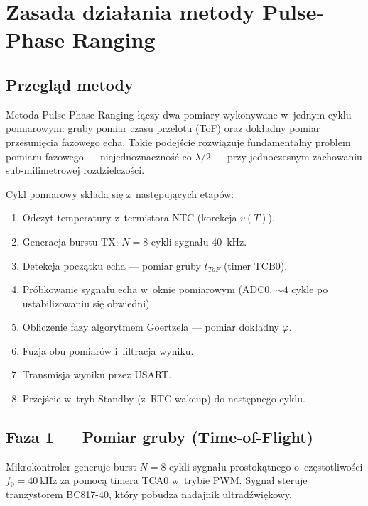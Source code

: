 \documentclass[a4paper,11pt]{article}
\begin{document}
\section{Zasada działania metody Pulse-Phase Ranging}
\label{sec:zasada}

\subsection{Przegląd metody}

Metoda Pulse-Phase Ranging łączy dwa pomiary wykonywane w~jednym cyklu
pomiarowym: gruby pomiar czasu przelotu (ToF) oraz dokładny pomiar przesunięcia
fazowego echa. Takie podejście rozwiązuje fundamentalny problem pomiaru fazowego
--- niejednoznaczność co $\lambda/2$ --- przy jednoczesnym zachowaniu sub-milimetrowej
rozdzielczości.

Cykl pomiarowy składa się z~następujących etapów:
\begin{enumerate}[nosep]
    \item Odczyt temperatury z~termistora NTC (korekcja $v(T)$).
    \item Generacja burstu TX: $N = 8$ cykli sygnału \SI{40}{\kilo\hertz}.
    \item Detekcja początku echa --- pomiar gruby $t_{ToF}$ (timer TCB0).
    \item Próbkowanie sygnału echa w~oknie pomiarowym (ADC0, ${\sim}4$ cykle po ustabilizowaniu się obwiedni).
    \item Obliczenie fazy algorytmem Goertzela --- pomiar dokładny $\varphi$.
    \item Fuzja obu pomiarów i~filtracja wyniku.
    \item Transmisja wyniku przez USART.
    \item Przejście w~tryb Standby (z~RTC wakeup) do następnego cyklu.
\end{enumerate}

\subsection{Faza 1 --- Pomiar gruby (Time-of-Flight)}
\label{sec:tof}

Mikrokontroler generuje burst $N = 8$ cykli sygnału prostokątnego o~częstotliwości
$f_0 = \SI{40}{\kilo\hertz}$ za pomocą timera TCA0 w~trybie PWM. Sygnał
steruje tranzystorem BC817-40, który pobudza nadajnik ultradźwiękowy.
\end{document}
